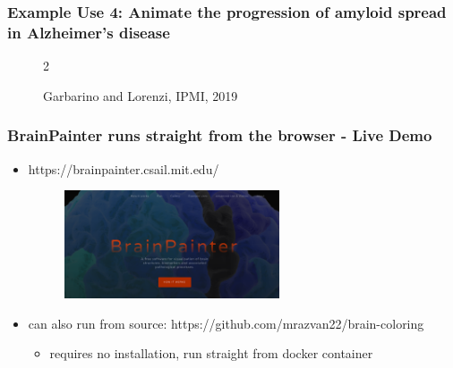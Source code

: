 \documentclass[10pt,xcolor=table,aspectratio=169]{beamer}
\begin{document}
\begin{frame}
 \frametitle{Example Use 4: Animate the progression of amyloid spread in Alzheimer's disease}

 
\begin{figure}
\centering
\newcommand{\speed}{2} 
\begin{animateinline}{\speed}  
\end{animateinline}

Garbarino and Lorenzi, IPMI, 2019
\end{figure}

  
\end{frame}


\begin{frame}
 \frametitle{BrainPainter runs straight from the browser - Live Demo}
 
 \begin{itemize}
  \item https://brainpainter.csail.mit.edu/
 
 \begin{figure}
  \includegraphics[width=0.6\textwidth]{images/frontPage}
 \end{figure}
 
 \item can also run from source: https://github.com/mrazvan22/brain-coloring
 \begin{itemize}
  \item requires no installation, run straight from docker container
 \end{itemize}
 
 \end{itemize}
 
  
\end{frame}
\end{document}
